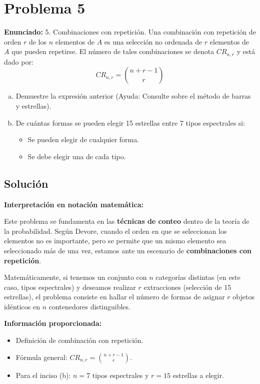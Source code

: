 \documentclass[a4paper]{article}
\begin{document}
\section{Problema 5}
\textbf{Enunciado:}
5. Combinaciones con repetición. Una combinación con repetición de orden $r$ de los $n$ elementos de $A$ es una selección no ordenada de $r$ elementos de $A$ que pueden repetirse. El número de tales combinaciones se denota $CR_{n,r}$ y está dado por:
$$ CR_{n,r} = \binom{n + r - 1}{r} $$
\begin{enumerate}[a.]
    \item Demuestre la expresión anterior (Ayuda: Consulte sobre el método de barras y estrellas).
    \item De cuántas formas se pueden elegir 15 estrellas entre 7 tipos espectrales si:
    \begin{itemize}
        \item Se pueden elegir de cualquier forma.
        \item Se debe elegir una de cada tipo.
    \end{itemize}
\end{enumerate}

\subsection*{Solución}

\textbf{Interpretación en notación matemática:}

Este problema se fundamenta en las \textbf{técnicas de conteo} dentro de la teoría de la probabilidad. Según Devore, cuando el orden en que se seleccionan los elementos no es importante, pero se permite que un mismo elemento sea seleccionado más de una vez, estamos ante un escenario de \textbf{combinaciones con repetición}. 

Matemáticamente, si tenemos un conjunto con $n$ categorías distintas (en este caso, tipos espectrales) y deseamos realizar $r$ extracciones (selección de 15 estrellas), el problema consiste en hallar el número de formas de asignar $r$ objetos idénticos en $n$ contenedores distinguibles.

\textbf{Información proporcionada:}
\begin{itemize}
    \item Definición de combinación con repetición.
    \item Fórmula general: $CR_{n,r} = \binom{n+r-1}{r}$.
    \item Para el inciso (b): $n = 7$ tipos espectrales y $r = 15$ estrellas a elegir.
\end{itemize}
\end{document}
